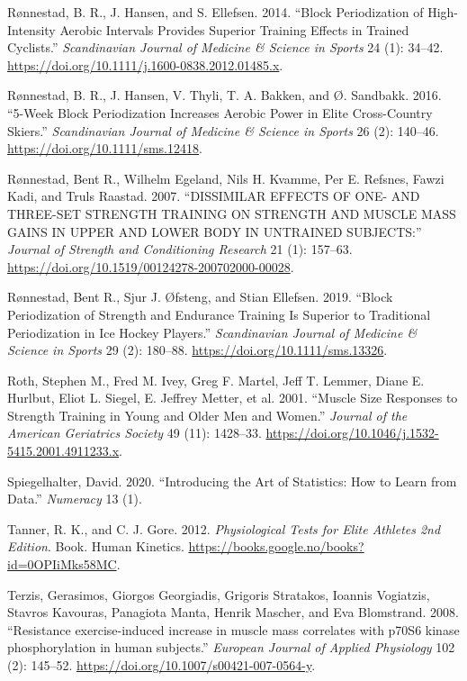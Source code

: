 \documentclass[
  letterpaper,
  DIV=11,
  numbers=noendperiod]{scrreprt}
\newlength{\cslhangindent}
\newenvironment{CSLReferences}[2] %
 {\begin{list}{}{%
  \setlength{\itemindent}{0pt}
  \setlength{\leftmargin}{0pt}
  \setlength{\parsep}{0pt}
  \ifodd #1
   \setlength{\leftmargin}{\cslhangindent}
   \setlength{\itemindent}{-1\cslhangindent}
  \fi
  \setlength{\itemsep}{#2\baselineskip}}}
 {\end{list}}
\begin{document}
\begin{CSLReferences}{1}{0}
Rønnestad, B. R., J. Hansen, and S. Ellefsen. 2014. {``Block
Periodization of High{-}Intensity Aerobic Intervals Provides Superior
Training Effects in Trained Cyclists.''} \emph{Scandinavian Journal of
Medicine \& Science in Sports} 24 (1): 34--42.
\url{https://doi.org/10.1111/j.1600-0838.2012.01485.x}.

Rønnestad, B. R., J. Hansen, V. Thyli, T. A. Bakken, and Ø. Sandbakk.
2016. {``5{-}Week Block Periodization Increases Aerobic Power in Elite
Cross{-}Country Skiers.''} \emph{Scandinavian Journal of Medicine \&
Science in Sports} 26 (2): 140--46.
\url{https://doi.org/10.1111/sms.12418}.

Rønnestad, Bent R., Wilhelm Egeland, Nils H. Kvamme, Per E. Refsnes,
Fawzi Kadi, and Truls Raastad. 2007. {``DISSIMILAR EFFECTS OF ONE- AND
THREE-SET STRENGTH TRAINING ON STRENGTH AND MUSCLE MASS GAINS IN UPPER
AND LOWER BODY IN UNTRAINED SUBJECTS:''} \emph{Journal of Strength and
Conditioning Research} 21 (1): 157--63.
\url{https://doi.org/10.1519/00124278-200702000-00028}.

Rønnestad, Bent R., Sjur J. Øfsteng, and Stian Ellefsen. 2019. {``Block
Periodization of Strength and Endurance Training Is Superior to
Traditional Periodization in Ice Hockey Players.''} \emph{Scandinavian
Journal of Medicine \& Science in Sports} 29 (2): 180--88.
\url{https://doi.org/10.1111/sms.13326}.

Roth, Stephen M., Fred M. Ivey, Greg F. Martel, Jeff T. Lemmer, Diane E.
Hurlbut, Eliot L. Siegel, E. Jeffrey Metter, et al. 2001. {``Muscle Size
Responses to Strength Training in Young and Older Men and Women.''}
\emph{Journal of the American Geriatrics Society} 49 (11): 1428--33.
\url{https://doi.org/10.1046/j.1532-5415.2001.4911233.x}.

Spiegelhalter, David. 2020. {``Introducing the Art of Statistics: How to
Learn from Data.''} \emph{Numeracy} 13 (1).

Tanner, R. K., and C. J. Gore. 2012. \emph{Physiological Tests for Elite
Athletes 2nd Edition}. Book. Human Kinetics.
\url{https://books.google.no/books?id=0OPIiMks58MC}.

Terzis, Gerasimos, Giorgos Georgiadis, Grigoris Stratakos, Ioannis
Vogiatzis, Stavros Kavouras, Panagiota Manta, Henrik Mascher, and Eva
Blomstrand. 2008. {``Resistance exercise-induced increase in muscle mass
correlates with p70S6 kinase phosphorylation in human subjects.''}
\emph{European Journal of Applied Physiology} 102 (2): 145--52.
\url{https://doi.org/10.1007/s00421-007-0564-y}.


\end{CSLReferences}
\end{document}

